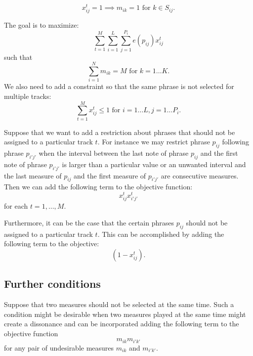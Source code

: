 \documentclass[11pt,a4paper]{article}
\begin{document}
\begin{equation}
 x_{ij}^t = 1 \implies m_{ik}=1 \mbox{ for } k \in S_{ij}.
 \end{equation}

 The goal is to maximize:
 \begin{equation}
 \sum_{t=1}^M \sum_{i=1}^L\sum_{j=1}^{P_i} e(p_{ij})x_{ij}^t
 \end{equation}
 such that
 \begin{equation}
 \sum_{i=1}^N m_{ik} = M \mbox{ for }k=1\dots K. 
 \end{equation} 
 We also need to add a constraint so that the same phrase is not selected for multiple tracks:
  \begin{equation}
 \sum_{t=1}^M x_{ij}^t \leq 1 \mbox{ for }i=1\dots L, j=1 \dots P_i. 
 \end{equation}
 
 Suppose that we want to add a restriction about phrases that should not be assigned to a particular track $ t $. For instance we may restrict phrase $ p_{ij} $ following phrase $ p_{i'j'} $ when the interval between the last note of phrase $ p_{ij} $ and the first note of phrase $p_{i'j'} $ is larger than a particular value or an unwanted interval and the last measure of $ p_{ij} $ and the first measure of $ p_{i'j'} $ are consecutive measures. Then we can add the following term to the objective function:
 \begin{equation}
 x_{ij}^tx_{i'j'}^t
 \end{equation} 
 for each $ t=1,\dots,M $.
 
 Furthermore, it can be the case that the certain phrases $ p_{ij} $ should not be assigned to a particular track $ t $. This can be accomplished by adding the following term to the objective:
 \begin{equation}
 (1-x_{ij}^t).
 \end{equation} 
 
 \subsection{Further conditions}
 Suppose that two measures should not be selected at the same time. Such a condition might be desirable when two measures played at the same time might create a dissonance and can be incorporated adding the following term to the objective function
 \begin{equation}
 m_{ik}m_{i'k'}
 \end{equation}  
for any pair of undesirable measures $m_{ik}$ and $ m_{i'k'} $. 



\end{document}
